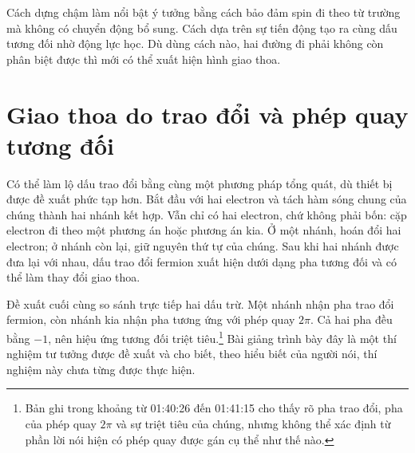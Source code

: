 Cách dựng chậm làm nổi bật ý tưởng bằng cách bảo đảm spin đi theo từ trường mà không có chuyển động bổ sung. Cách dựa trên sự tiến động tạo ra cùng dấu tương đối nhờ động lực học. Dù dùng cách nào, hai đường đi phải không còn phân biệt được thì mới có thể xuất hiện hình giao thoa.

\begin{classroomqa}
\end{classroomqa}

\begin{classroomqa}
\end{classroomqa}

\section{Giao thoa do trao đổi và phép quay tương đối}

Có thể làm lộ dấu trao đổi bằng cùng một phương pháp tổng quát, dù thiết bị được đề xuất phức tạp hơn. Bắt đầu với hai electron và tách hàm sóng chung của chúng thành hai nhánh kết hợp. Vẫn chỉ có hai electron, chứ không phải bốn: cặp electron đi theo một phương án hoặc phương án kia. Ở một nhánh, hoán đổi hai electron; ở nhánh còn lại, giữ nguyên thứ tự của chúng. Sau khi hai nhánh được đưa lại với nhau, dấu trao đổi fermion xuất hiện dưới dạng pha tương đối và có thể làm thay đổi giao thoa.

Đề xuất cuối cùng so sánh trực tiếp hai dấu trừ. Một nhánh nhận pha trao đổi fermion, còn nhánh kia nhận pha tương ứng với phép quay \(2\pi\). Cả hai pha đều bằng \(-1\), nên hiệu ứng tương đối triệt tiêu.\footnote{Bản ghi trong khoảng từ 01:40:26 đến 01:41:15 cho thấy rõ pha trao đổi, pha của phép quay \(2\pi\) và sự triệt tiêu của chúng, nhưng không thể xác định từ phần lời nói hiện có phép quay được gán cụ thể như thế nào.} Bài giảng trình bày đây là một thí nghiệm tư tưởng được đề xuất và cho biết, theo hiểu biết của người nói, thí nghiệm này chưa từng được thực hiện.

